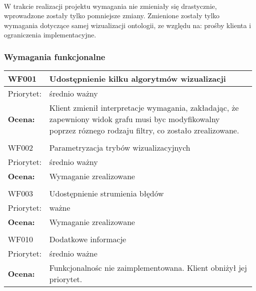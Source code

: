 \paragraph{} W trakcie realizacji projektu wymagania nie zmieniały się drastycznie, wprowadzone zostały tylko pomniejsze zmiany. Zmienione zostały tylko wymagania dotyczące samej wizualizacji ontologii, ze względu na: prośby klienta i ograniczenia implementacyjne.




\subsubsection{Wymagania funkcjonalne}


\begin{center}

\begin{tabular}{|m{3cm}|m{9cm}|} \hline

WF001 & Udostępnienie kilku algorytmów wizualizacji \\ \hline
Priorytet: & średnio ważny\\ \hline
\textbf{Ocena:} & Klient zmienił interpretacje wymagania, zakładając, że zapewniony widok grafu musi byc modyfikowalny poprzez róznego rodzaju filtry, co zostało zrealizowane. \\ \hline
\multicolumn{2}{c}{} \\
 \hline

WF002 & Parametryzacja trybów wizualizacyjnych \\ \hline
Priorytet: & średnio ważny \\ \hline
\textbf{Ocena:} & Wymaganie zrealizowane \\ \hline
\multicolumn{2}{c}{} \\
 \hline

WF003 & Udostępnienie strumienia błędów \\ \hline
Priorytet: & ważne \\ \hline
\textbf{Ocena:} & Wymaganie zrealizowane \\ \hline
\multicolumn{2}{c}{} \\
 \hline

WF010 & Dodatkowe informacje \\ \hline
Priorytet: & średnio ważne \\ \hline
\textbf{Ocena:} & Funkcjonalnośc nie zaimplementowana. Klient obniżył jej priorytet. \\ \hline
\end{tabular}

\end{center}

